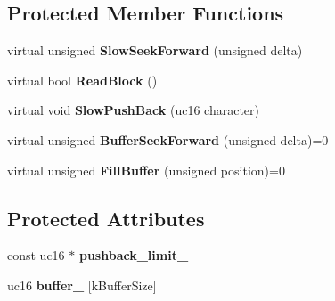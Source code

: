 \subsection*{Protected Member Functions}
\begin{DoxyCompactItemize}
\item 
\hypertarget{classv8_1_1internal_1_1_buffered_utf16_character_stream_aa06eadc2d97e240677224f3a7dd2e77c}{}virtual unsigned {\bfseries Slow\+Seek\+Forward} (unsigned delta)\label{classv8_1_1internal_1_1_buffered_utf16_character_stream_aa06eadc2d97e240677224f3a7dd2e77c}

\item 
\hypertarget{classv8_1_1internal_1_1_buffered_utf16_character_stream_ac1c7fa15478b1937ca8a02471ec2fbf6}{}virtual bool {\bfseries Read\+Block} ()\label{classv8_1_1internal_1_1_buffered_utf16_character_stream_ac1c7fa15478b1937ca8a02471ec2fbf6}

\item 
\hypertarget{classv8_1_1internal_1_1_buffered_utf16_character_stream_a1f213deb00e34d6ae575b9b0c7538295}{}virtual void {\bfseries Slow\+Push\+Back} (uc16 character)\label{classv8_1_1internal_1_1_buffered_utf16_character_stream_a1f213deb00e34d6ae575b9b0c7538295}

\item 
\hypertarget{classv8_1_1internal_1_1_buffered_utf16_character_stream_a09fa05edefd32a000945a3dbb0c050b4}{}virtual unsigned {\bfseries Buffer\+Seek\+Forward} (unsigned delta)=0\label{classv8_1_1internal_1_1_buffered_utf16_character_stream_a09fa05edefd32a000945a3dbb0c050b4}

\item 
\hypertarget{classv8_1_1internal_1_1_buffered_utf16_character_stream_ae16805735fbb8851f9897962b5a4066c}{}virtual unsigned {\bfseries Fill\+Buffer} (unsigned position)=0\label{classv8_1_1internal_1_1_buffered_utf16_character_stream_ae16805735fbb8851f9897962b5a4066c}

\end{DoxyCompactItemize}
\subsection*{Protected Attributes}
\begin{DoxyCompactItemize}
\item 
\hypertarget{classv8_1_1internal_1_1_buffered_utf16_character_stream_a31f75aab15c72728ec42cde8be258b02}{}const uc16 $\ast$ {\bfseries pushback\+\_\+limit\+\_\+}\label{classv8_1_1internal_1_1_buffered_utf16_character_stream_a31f75aab15c72728ec42cde8be258b02}

\item 
\hypertarget{classv8_1_1internal_1_1_buffered_utf16_character_stream_a05943ea5a34bca700e4e8ce7308c7b55}{}uc16 {\bfseries buffer\+\_\+} \mbox{[}k\+Buffer\+Size\mbox{]}\label{classv8_1_1internal_1_1_buffered_utf16_character_stream_a05943ea5a34bca700e4e8ce7308c7b55}

\end{DoxyCompactItemize}
